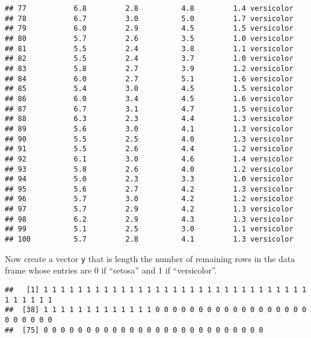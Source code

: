 \documentclass[
]{article}
\newenvironment{Shaded}{\begin{snugshade}}{\end{snugshade}}
\newcommand{\FunctionTok}[1]{\textcolor[rgb]{0.00,0.00,0.00}{#1}}
\newcommand{\NormalTok}[1]{#1}
\newcommand{\OtherTok}[1]{\textcolor[rgb]{0.56,0.35,0.01}{#1}}
\newcommand{\SpecialCharTok}[1]{\textcolor[rgb]{0.00,0.00,0.00}{#1}}
\newcommand{\StringTok}[1]{\textcolor[rgb]{0.31,0.60,0.02}{#1}}
\begin{document}
\begin{verbatim}
## 77           6.8         2.8          4.8         1.4 versicolor
## 78           6.7         3.0          5.0         1.7 versicolor
## 79           6.0         2.9          4.5         1.5 versicolor
## 80           5.7         2.6          3.5         1.0 versicolor
## 81           5.5         2.4          3.8         1.1 versicolor
## 82           5.5         2.4          3.7         1.0 versicolor
## 83           5.8         2.7          3.9         1.2 versicolor
## 84           6.0         2.7          5.1         1.6 versicolor
## 85           5.4         3.0          4.5         1.5 versicolor
## 86           6.0         3.4          4.5         1.6 versicolor
## 87           6.7         3.1          4.7         1.5 versicolor
## 88           6.3         2.3          4.4         1.3 versicolor
## 89           5.6         3.0          4.1         1.3 versicolor
## 90           5.5         2.5          4.0         1.3 versicolor
## 91           5.5         2.6          4.4         1.2 versicolor
## 92           6.1         3.0          4.6         1.4 versicolor
## 93           5.8         2.6          4.0         1.2 versicolor
## 94           5.0         2.3          3.3         1.0 versicolor
## 95           5.6         2.7          4.2         1.3 versicolor
## 96           5.7         3.0          4.2         1.2 versicolor
## 97           5.7         2.9          4.2         1.3 versicolor
## 98           6.2         2.9          4.3         1.3 versicolor
## 99           5.1         2.5          3.0         1.1 versicolor
## 100          5.7         2.8          4.1         1.3 versicolor
\end{verbatim}

Now create a vector \texttt{y} that is length the number of remaining
rows in the data frame whose entries are 0 if ``setosa'' and 1 if
``versicolor''.

\begin{Shaded}
\end{Shaded}

\begin{verbatim}
##   [1] 1 1 1 1 1 1 1 1 1 1 1 1 1 1 1 1 1 1 1 1 1 1 1 1 1 1 1 1 1 1 1 1 1 1 1 1 1
##  [38] 1 1 1 1 1 1 1 1 1 1 1 1 1 0 0 0 0 0 0 0 0 0 0 0 0 0 0 0 0 0 0 0 0 0 0 0 0
##  [75] 0 0 0 0 0 0 0 0 0 0 0 0 0 0 0 0 0 0 0 0 0 0 0 0 0 0
\end{verbatim}
\end{document}
